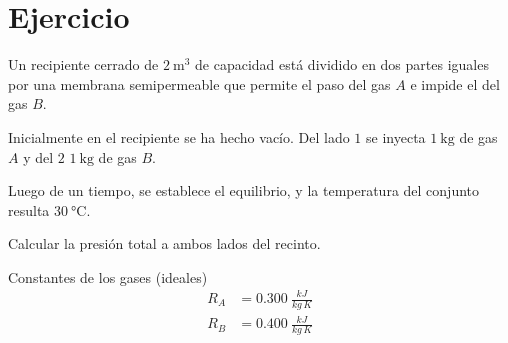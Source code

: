 \section{Ejercicio}\label{ej:Chap03Ejercicio08}
Un recipiente cerrado de $\SI{2}{\meter^3}$ de capacidad está dividido en dos partes iguales por una membrana semipermeable que permite el paso del gas $A$ e impide el del gas $B$.

Inicialmente en el recipiente se ha hecho vacío. Del lado $1$ se inyecta $\SI{1}{\kg}$ de gas $A$ y del $2$ $\SI{1}{\kg}$ de gas $B$. 

Luego de un tiempo, se establece el equilibrio, y la temperatura del conjunto resulta $\SI{30}{\celsius}$.

Calcular la presión total a ambos lados del recinto.

Constantes de los gases (ideales) 
\begin{align*}
    R_A&=\SI{0.300}{\frac{kJ}{kg\,K}}\\
    R_B&=\SI{0.400}{\frac{kJ}{kg\,K}}
\end{align*}